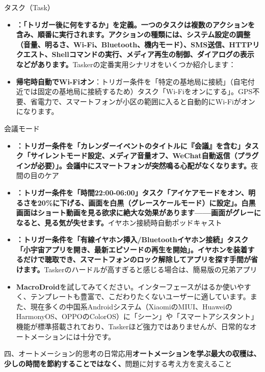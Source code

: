 タスク（Task）

\begin{itemize}
  \item \textbf{：「トリガー後に何をするか」を定義。一つのタスクは複数のアクションを含み、順番に実行されます。アクションの種類には、システム設定の調整（音量、明るさ、Wi-Fi、Bluetooth、機内モード）、SMS送信、HTTPリクエスト、Shellコマンドの実行、メディア再生の制御、ダイアログの表示などがあります。}Taskerの定番実用シナリオをいくつか紹介します：
  \item \textbf{帰宅時自動でWi-Fiオン}：トリガー条件を「特定の基地局に接続」（自宅付近では固定の基地局に接続するため）タスク「Wi-Fiをオンにする」。GPS不要、省電力で、スマートフォンが小区の範囲に入ると自動的にWi-Fiがオンになります。
\end{itemize}

会議モード

\begin{itemize}
  \item \textbf{：トリガー条件を「カレンダーイベントのタイトルに『会議』を含む」タスク「サイレントモード設定、メディア音量オフ、WeChat自動返信（プラグインが必要）」。会議中にスマートフォンが突然鳴る心配がなくなります。}夜間の目のケア
  \item \textbf{：トリガー条件を「時間22:00-06:00」タスク「アイケアモードをオン、明るさを20\%に下げる、画面を白黒（グレースケールモード）に設定」。白黒画面はショート動画を見る欲求に絶大な効果があります——画面がグレーになると、見る気が失せます。}イヤホン接続時自動ポッドキャスト
  \item \textbf{：トリガー条件を「有線イヤホン挿入/Bluetoothイヤホン接続」タスク「小宇宙アプリを開き、最新エピソードの再生を開始」。イヤホンを装着するだけで聴取でき、スマートフォンのロック解除してアプリを探す手間が省けます。}Taskerのハードルが高すぎると感じる場合は、簡易版の兄弟アプリ
  \item \textbf{MacroDroid}を試してみてください。インターフェースがはるか使いやすく、テンプレートも豊富で、こだわりたくないユーザーに適しています。また、現在多くの中国系Androidシステム（XiaomiのMIUI、HuaweiのHarmonyOS、OPPOのColorOS）に「シーン」や「スマートアシスタント」機能が標準搭載されており、Taskerほど強力ではありませんが、日常的なオートメーションには十分です。
\end{itemize}

四、オートメーション的思考の日常応用\textbf{オートメーションを学ぶ最大の収穫は、少しの時間を節約することではなく、}問題に対する考え方を変えること



